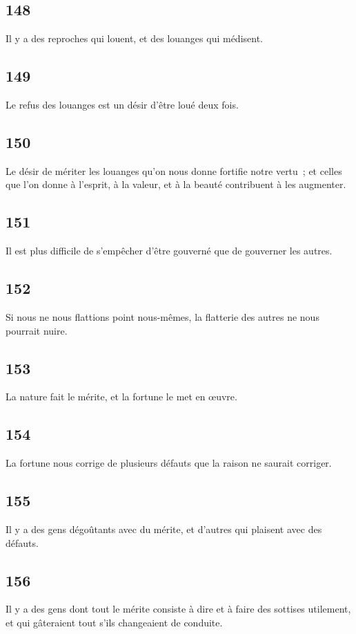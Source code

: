 \documentclass[french,twoside]{book} %
\begin{document}
\subsection[{148}]{ \textsc{148} }
\noindent Il y a des reproches qui louent, et des louanges qui médisent.
\subsection[{149}]{ \textsc{149} }
\noindent Le refus des louanges est un désir d’être loué deux fois.
\subsection[{150}]{ \textsc{150} }
\noindent Le désir de mériter les louanges qu’on nous donne fortifie notre vertu ; et celles que l’on donne à l’esprit, à la valeur, et à la beauté contribuent à les augmenter.
\subsection[{151}]{ \textsc{151} }
\noindent Il est plus difficile de s’empêcher d’être gouverné que de gouverner les autres.
\subsection[{152}]{ \textsc{152} }
\noindent Si nous ne nous flattions point nous-mêmes, la flatterie des autres ne nous pourrait nuire.
\subsection[{153}]{ \textsc{153} }
\noindent La nature fait le mérite, et la fortune le met en œuvre.
\subsection[{154}]{ \textsc{154} }
\noindent La fortune nous corrige de plusieurs défauts que la raison ne saurait corriger.
\subsection[{155}]{ \textsc{155} }
\noindent Il y a des gens dégoûtants avec du mérite, et d’autres qui plaisent avec des défauts.
\subsection[{156}]{ \textsc{156} }
\noindent Il y a des gens dont tout le mérite consiste à dire et à faire des sottises utilement, et qui gâteraient tout s’ils changeaient de conduite.
\end{document}
